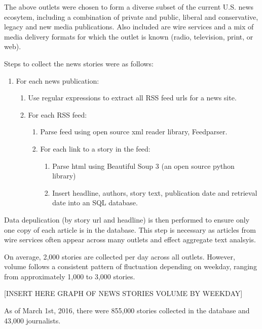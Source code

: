 The above outlets were chosen to form a diverse subset of the current U.S. news ecosytem, including a combination of private and public, liberal and conservative, legacy and new media publications. Also included are wire services and a mix of media delivery formats for which the outlet is known (radio, television, print, or web).

Steps to collect the news stories were as follows:

 \begin{enumerate}
    \item For each news publication:
    \begin {enumerate}
    \itemsep-1em 
        \item Use regular expressions to extract all RSS feed urls for a news site.
        \item For each RSS feed:
        \begin {enumerate}
        \itemsep-1em 
            \item Parse feed using open source xml reader library, Feedparser.
            \item For each link to a story in the feed:             
            \begin {enumerate}
                \item Parse html using Beautiful Soup 3 (an open source python library)
                \item Insert headline, authors, story text, publication date and retrieval date into an SQL database.

            \end {enumerate}
        \end{enumerate}
    \end{enumerate}
\end{enumerate}

Data depulication (by story url and headline) is then performed to ensure only one copy of each article is in the database. This step is necessary as articles from wire services often appear across many outlets and effect aggregate text analsyis.

On average, 2,000 stories are collected per day across all outlets. However, volume follows a consistent pattern of fluctuation depending on weekday, ranging from approximately 1,000 to 3,000 stories.

[INSERT HERE GRAPH OF NEWS STORIES VOLUME BY WEEKDAY]

As of March 1st, 2016, there were 855,000 stories collected in the database and 43,000 journalists.

